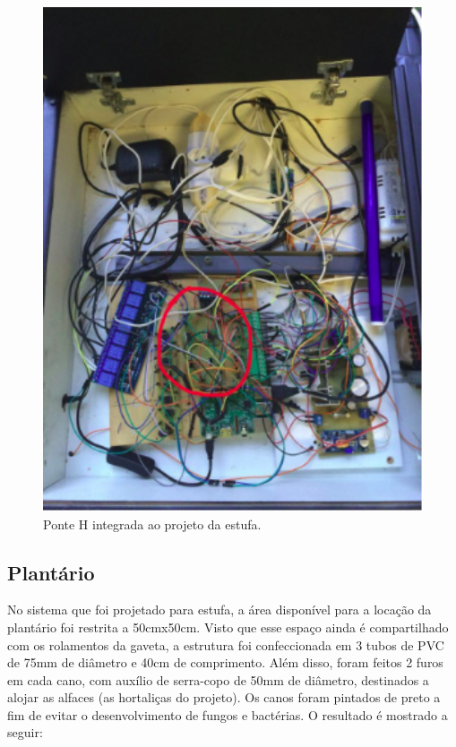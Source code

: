 \begin{figure}[H]
	\centering
	\includegraphics[width=14cm]{figuras/ponteHintegrada.png}
	\caption{Ponte H integrada ao projeto da estufa.}
	\label{ponteHintegrada}
\end{figure}


\subsection{Plantário}

No sistema que foi projetado para estufa, a área disponível para a locação da plantário foi restrita a 50cmx50cm. Visto que esse espaço ainda é compartilhado com os rolamentos da gaveta, a estrutura foi confeccionada em 3 tubos de PVC de 75mm de diâmetro e 40cm de comprimento. Além disso, foram feitos 2 furos em cada cano, com auxílio de serra-copo de 50mm de diâmetro, destinados a alojar as alfaces (as hortaliças do projeto). Os canos foram pintados de preto a fim de evitar o desenvolvimento de fungos e bactérias. O resultado é mostrado a seguir:

